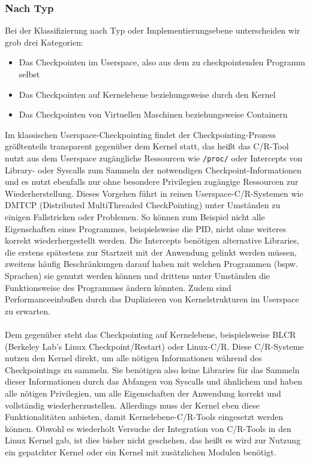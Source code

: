 \documentclass[a4paper]{article}
\begin{document}
\subsubsection{Nach Typ}
Bei der Klassifizierung nach Typ oder Implementierungsebene unterscheiden wir grob drei Kategorien: 
\begin{itemize}
    \item Das Checkpointen im Userspace, also aus dem zu checkpointenden Programm selbst
    \item Das Checkpointen auf Kernelebene beziehungsweise durch den Kernel
    \item Das Checkpointen von Virtuellen Maschinen beziehungsweise Containern
\end{itemize}
Im klassischen Userspace-Checkpointing findet der Checkpointing-Prozess größtenteils transparent gegenüber dem Kernel statt, das heißt das C/R-Tool nutzt aus dem Userspace zugängliche Ressourcen wie \texttt{/proc/} oder Intercepts von Library- oder Syscalls zum Sammeln der notwendigen Checkpoint-Informationen und es nutzt ebenfalls nur ohne besondere Privilegien zugängige Ressourcen zur Wiederherstellung. 
Dieses Vorgehen führt in reinen Userspace-C/R-Systemen wie DMTCP (Distributed MultiThreaded CheckPointing) unter Umständen zu einigen Fallstricken oder Problemen. 
So können zum Beispiel nicht alle Eigenschaften eines Programmes, beispielsweise die PID, nicht ohne weiteres korrekt wiederhergestellt werden. 
Die Intercepts benötigen alternative Libraries, die erstens spätestens zur Startzeit mit der Anwendung gelinkt werden müssen, zweitens häufig Beschränkungen darauf haben mit welchen Programmen (bspw. Sprachen) sie genutzt werden können und drittens unter Umständen die Funktionsweise des Programmes ändern könnten. Zudem sind Performanceeinbußen durch das Duplizieren von Kernelstrukturen im Userspace zu erwarten.\\ \\
Dem gegenüber steht das Checkpointing auf Kernelebene, beispielsweise BLCR (Berkeley Lab's Linux Checkpoint/Restart) oder Linux-C/R. %
Diese C/R-Systeme nutzen den Kernel direkt, um alle nötigen Informationen während des Checkpointings zu sammeln. 
Sie benötigen also keine Libraries für das Sammeln dieser Informationen durch das Abfangen von Syscalls und ähnlichem und haben alle nötigen Privilegien, um alle Eigenschaften der Anwendung korrekt und vollständig wiederherzustellen. 
Allerdings muss der Kernel eben diese Funktionalitäten anbieten, damit Kernelebene-C/R-Tools eingesetzt werden können. Obwohl es wiederholt Versuche der Integration von C/R-Tools in den Linux Kernel gab, ist dies bisher nicht geschehen, das heißt es wird zur Nutzung ein gepatchter Kernel oder ein Kernel mit zusätzlichen Modulen benötigt.\\
\end{document}
